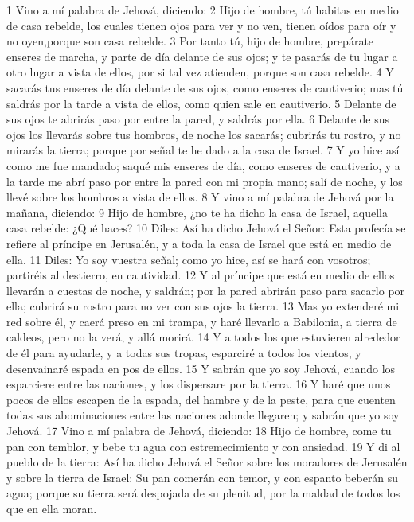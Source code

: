 1 Vino a mí palabra de Jehová, diciendo:
2 Hijo de hombre, tú habitas en medio de casa rebelde, los cuales tienen ojos para ver y no ven, tienen oídos para oír y no oyen,porque son casa rebelde.
3 Por tanto tú, hijo de hombre, prepárate enseres de marcha, y parte de día delante de sus ojos; y te pasarás de tu lugar a otro lugar a vista de ellos, por si tal vez atienden, porque son casa rebelde.
4 Y sacarás tus enseres de día delante de sus ojos, como enseres de cautiverio; mas tú saldrás por la tarde a vista de ellos, como quien sale en cautiverio.
5 Delante de sus ojos te abrirás paso por entre la pared, y saldrás por ella.
6 Delante de sus ojos los llevarás sobre tus hombros, de noche los sacarás; cubrirás tu rostro, y no mirarás la tierra; porque por señal te he dado a la casa de Israel.
7 Y yo hice así como me fue mandado; saqué mis enseres de día, como enseres de cautiverio, y a la tarde me abrí paso por entre la pared con mi propia mano; salí de noche, y los llevé sobre los hombros a vista de ellos.
8 Y vino a mí palabra de Jehová por la mañana, diciendo:
9 Hijo de hombre, ¿no te ha dicho la casa de Israel, aquella casa rebelde: ¿Qué haces?
10 Diles: Así ha dicho Jehová el Señor: Esta profecía se refiere al príncipe en Jerusalén, y a toda la casa de Israel que está en medio de ella.
11 Diles: Yo soy vuestra señal; como yo hice, así se hará con vosotros; partiréis al destierro, en cautividad. 
12 Y al príncipe que está en medio de ellos llevarán a cuestas de noche, y saldrán; por la pared abrirán paso para sacarlo por ella; cubrirá su rostro para no ver con sus ojos la tierra.
13 Mas yo extenderé mi red sobre él, y caerá preso en mi trampa, y haré llevarlo a Babilonia, a tierra de caldeos, pero no la verá, y allá morirá.
14 Y a todos los que estuvieren alrededor de él para ayudarle, y a todas sus tropas, esparciré a todos los vientos, y desenvainaré espada en pos de ellos. 
15 Y sabrán que yo soy Jehová, cuando los esparciere entre las naciones, y los dispersare por la tierra.
16 Y haré que unos pocos de ellos escapen de la espada, del hambre y de la peste, para que cuenten todas sus abominaciones entre las naciones adonde llegaren; y sabrán que yo soy Jehová.
17 Vino a mí palabra de Jehová, diciendo:
18 Hijo de hombre, come tu pan con temblor, y bebe tu agua con estremecimiento y con ansiedad. 
19 Y di al pueblo de la tierra: Así ha dicho Jehová el Señor sobre los moradores de Jerusalén y sobre la tierra de Israel: Su pan comerán con temor, y con espanto beberán su agua; porque su tierra será despojada de su plenitud, por la maldad de todos los que en ella moran.
